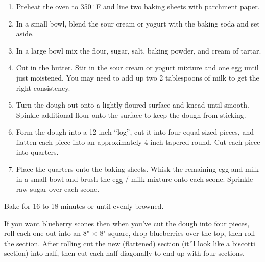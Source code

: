 \documentclass{article}
\begin{document}
\begin{enumerate}
    \item{Preheat the oven to 350 $^{\circ}$F and line two baking sheets with parchment paper.}
    \item{In a small bowl, blend the sour cream or yogurt with the baking soda and set aside.}
    \item{In a large bowl mix the flour, sugar, salt, baking powder, and cream of tartar.}
    \item{Cut in the butter. Stir in the sour cream or yogurt mixture and one egg until just moistened.
                You may need to add up two 2 tablespoons of milk to get the right consistency.}
    \item{Turn the dough out onto a lightly floured surface and knead until smooth. Spinkle additional
                flour onto the surface to keep the dough from sticking.}
    \item{Form the dough into a 12 inch ``log'', cut it into four equal-sized pieces, and flatten
                each piece into an approximately 4 inch tapered round. Cut each piece into quarters.}
    \item{Place the quarters onto the baking sheets. Whisk the remaining egg and milk in a small bowl
                and brush the egg / milk mixture onto each scone. Sprinkle raw sugar over each scone.}
\end{enumerate}

\bigskip

Bake for 16 to 18 minutes or until evenly browned.

If you want blueberry scones then when you've cut the dough
into four pieces, roll each one out into an 8" $\times$ 8" square,
drop blueberries over the top, then roll the section. After
rolling cut the new (flattened) section (it'll look like a
biscotti section) into half, then cut each half diagonally
to end up with four sections.

\end{document}
